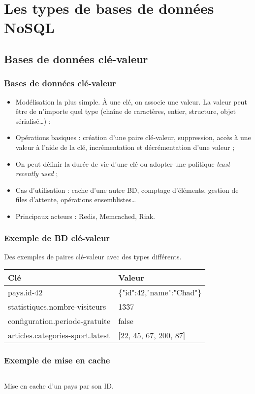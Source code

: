 \section{Les types de bases de données NoSQL}

	\subsection{Bases de données clé-valeur}
	\begin{frame}
		\frametitle{Bases de données clé-valeur}

		\begin{itemize}
			\item Modélisation la plus simple. À une clé, on associe une valeur. La valeur peut être de n'importe quel type (chaîne de caractères, entier, structure, objet sérialisé\dots) ;
			\item Opérations basiques : création d'une paire clé-valeur, suppression, accès à une valeur à l'aide de la clé, incrémentation et décrémentation d'une valeur ;
			\item On peut définir la durée de vie d'une clé ou adopter une politique \textit{least recently used} ;
			\item Cas d'utilisation : cache d'une autre BD, comptage d'éléments, gestion de files d'attente, opérations ensemblistes\dots
			\item Principaux acteurs : Redis, Memcached, Riak.
		\end{itemize}

	\end{frame}

	\begin{frame}
		\frametitle{Exemple de BD clé-valeur}

		Des exemples de paires clé-valeur avec des types différents.
		\vspace{15px}

		\begin{tabular}{|l|l|}
			\hline
			\textbf{Clé} & \textbf{Valeur} \\ \hline\hline
			pays.id-42 & \{"id":42,"name":"Chad"\} \\ \hline
			statistiques.nombre-visiteurs & 1337 \\ \hline
			configuration.periode-gratuite & false \\ \hline
			articles.categories-sport.latest & [22, 45, 67, 200, 87] \\ \hline
		\end{tabular}

	\end{frame}

	\begin{frame}
		\frametitle{Exemple de mise en cache}

		\begin{listing}[H]
			\inputminted[fontsize=\tiny, linenos=true]{php}{code/cacheRepository.php}
			\caption{Mise en cache d'un pays par son ID.}
		\end{listing}

	\end{frame}